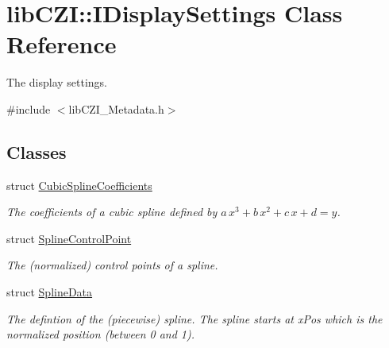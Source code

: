 \hypertarget{classlib_c_z_i_1_1_i_display_settings}{}\section{lib\+C\+ZI\+:\+:I\+Display\+Settings Class Reference}
\label{classlib_c_z_i_1_1_i_display_settings}


The display settings.  




{\ttfamily \#include $<$lib\+C\+Z\+I\+\_\+\+Metadata.\+h$>$}

\subsection*{Classes}
\begin{DoxyCompactItemize}
\item 
struct \hyperlink{structlib_c_z_i_1_1_i_display_settings_1_1_cubic_spline_coefficients}{Cubic\+Spline\+Coefficients}
\begin{DoxyCompactList}\small\item\em The coefficients of a cubic spline defined by $a\,x^3 + b\,x^2 + c\,x + d =y$. \end{DoxyCompactList}\item 
struct \hyperlink{structlib_c_z_i_1_1_i_display_settings_1_1_spline_control_point}{Spline\+Control\+Point}
\begin{DoxyCompactList}\small\item\em The (normalized) control points of a spline. \end{DoxyCompactList}\item 
struct \hyperlink{structlib_c_z_i_1_1_i_display_settings_1_1_spline_data}{Spline\+Data}
\begin{DoxyCompactList}\small\item\em The defintion of the (piecewise) spline. The spline starts at {\ttfamily x\+Pos} which is the normalized position (between 0 and 1). \end{DoxyCompactList}\end{DoxyCompactItemize}
